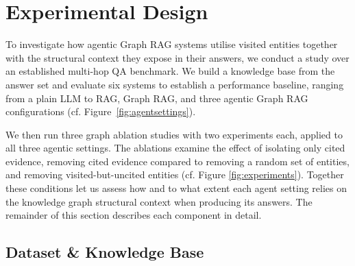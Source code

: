 \documentclass[
]{ceurart}
\begin{document}














\section{Experimental Design}

To investigate how agentic Graph RAG systems utilise visited entities together with the structural context they expose in their answers, we conduct a study over an established multi-hop QA benchmark. We build a knowledge base from the answer set and evaluate six systems to establish a performance baseline, ranging from a plain LLM to RAG, Graph RAG, and three agentic Graph RAG configurations (cf. Figure~\ref{fig:agentsettings}). 

We then run three graph ablation studies with two experiments each, applied to all three agentic settings. The ablations examine the effect of isolating only cited evidence, removing cited evidence compared to removing a random set of entities, and removing visited-but-uncited entities (cf. Figure \ref{fig:experiments}). Together these conditions let us assess how and to what extent each agent setting relies on the knowledge graph structural context when producing its answers. The remainder of this section describes each component in detail.

\subsection{Dataset \& Knowledge Base}
\end{document}
